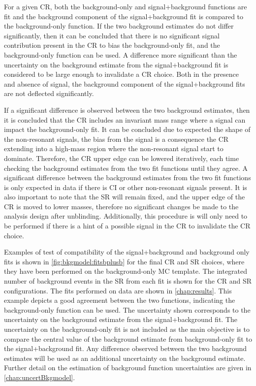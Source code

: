 For a given CR, both the background-only and signal+background functions are fit and the background component of the signal+background fit is compared to the background-only function. If the two background estimates do not differ significantly, then it can be concluded that there is no significant signal contribution present in the CR to bias the background-only fit, and the background-only function can be used. A difference  more significant than the uncertainty on the background estimate from the signal+background fit is considered to be large enough to invalidate a CR choice. Both in the presence and absence of signal, the background component of the signal+background fits are not deflected significantly. 

If a significant difference is observed between the two background estimates, then it is concluded that the CR includes an invariant mass range where a signal can impact the background-only fit. It can be concluded due to expected the shape of the non-resonant signals, the bias from the signal is a consequence the CR extending into a high-mass region where the non-resonant signal start to dominate. Therefore, the CR upper edge can be lowered iteratively, each time checking the background estimates from the two fit functions until they agree. A significant difference between the background estimates from the two fit functions is only expected in data if there is CI or other non-resonant signals present. It is also important to note that the SR will remain fixed, and the upper edge of the CR is moved to lower masses, therefore no significant changes be made to the analysis design after unblinding. Additionally, this procedure is will only need to be performed if there is a hint of a possible signal in the CR to invalidate the CR choice. 

Examples of test of compatibility of the signal+background and background only fits is shown in \cref{fig:bkgmodel:fitsbplusb} for the final CR and SR choices, where they have been performed on the background-only MC template. The integrated number of background events in the SR from each fit is shown for the CR and SR configurations. The fits performed on data are shown in \cref{chap:results}. This example depicts a good agreement between the two functions, indicating the background-only function can be used. The uncertainty shown corresponds to the uncertainty on the background estimate from the signal+background fit. The uncertainty on the background-only fit is not included as the main objective is to compare the central value of the background estimate from background-only fit to the signal+background fit. Any difference observed between the two background estimates will be used as an additional uncertainty on the background estimate. Further detail on the estimation of background function uncertainties are given in \cref{chap:uncertBkgmodel}. 

